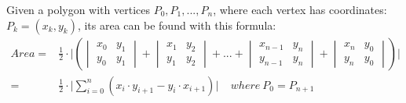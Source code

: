 \documentclass[acmtog, anonymous, review]{acmart}
\begin{document}
Given a polygon with vertices $P_0, P_1, ..., P_n$, where each vertex has coordinates: $P_k = (x_k, y_k)$, its area can be found with this formula:
\begin{align*}
	Area =& \frac{1}{2}\cdot\bigg|\left(\begin{vmatrix} x_0 & y_1\\y_0 & y_1 \end{vmatrix} + \begin{vmatrix} x_1 & y_2\\y_1 & y_2 \end{vmatrix} + ... + \begin{vmatrix} x_{n-1} & y_n\\y_{n-1} & y_n \end{vmatrix} + \begin{vmatrix} x_n & y_0\\y_n & y_0 \end{vmatrix}\right)\bigg|\\
	=& \frac{1}{2} \cdot \Big|\displaystyle\sum_{i=0}^{n}(x_i \cdot y_{i+1} - y_i \cdot x_{i+1})\Big| \ \ \ \ \ where \ P_0 = P_{n+1}
\end{align*}
\end{document}

